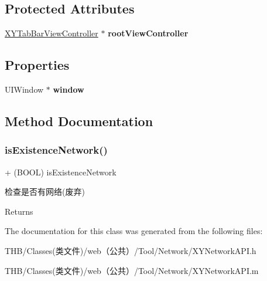 \subsection*{Protected Attributes}
\begin{DoxyCompactItemize}
\item 
\mbox{\label{interface_x_y_network_a_p_i_a345085cc3a5549412aa814ea98a12484}} 
\mbox{\hyperlink{interface_x_y_tab_bar_view_controller}{X\+Y\+Tab\+Bar\+View\+Controller}} $\ast$ {\bfseries root\+View\+Controller}
\end{DoxyCompactItemize}
\subsection*{Properties}
\begin{DoxyCompactItemize}
\item 
\mbox{\label{interface_x_y_network_a_p_i_acc54167f4fae1634c2d94a6f7b5ab7c4}} 
U\+I\+Window $\ast$ {\bfseries window}
\end{DoxyCompactItemize}


\subsection{Method Documentation}
\mbox{\label{interface_x_y_network_a_p_i_a909d8575585fcb3acba406c629e1054c}} 
\subsubsection{\texorpdfstring{is\+Existence\+Network()}{isExistenceNetwork()}}
{\footnotesize\ttfamily + (B\+O\+OL) is\+Existence\+Network \begin{DoxyParamCaption}{ }\end{DoxyParamCaption}}

检查是否有网络(废弃)

\begin{DoxyReturn}{Returns}

\end{DoxyReturn}


The documentation for this class was generated from the following files\+:\begin{DoxyCompactItemize}
\item 
T\+H\+B/\+Classes(类文件)/web（公共）/\+Tool/\+Network/X\+Y\+Network\+A\+P\+I.\+h\item 
T\+H\+B/\+Classes(类文件)/web（公共）/\+Tool/\+Network/X\+Y\+Network\+A\+P\+I.\+m\end{DoxyCompactItemize}
